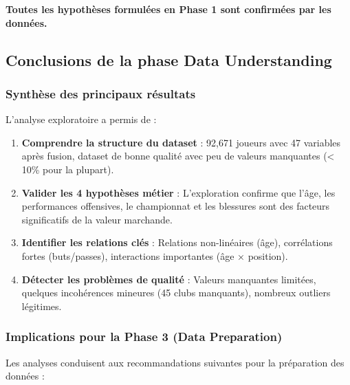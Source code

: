\documentclass[12pt,a4paper]{article}
\begin{document}
\textbf{Toutes les hypothèses formulées en Phase 1 sont confirmées par les données.}

\newpage

\subsection{Conclusions de la phase Data Understanding}

\subsubsection{Synthèse des principaux résultats}

L'analyse exploratoire a permis de :

\begin{enumerate}[leftmargin=*]
    \item \textbf{Comprendre la structure du dataset} : 92,671 joueurs avec 47 variables après fusion, dataset de bonne qualité avec peu de valeurs manquantes (< 10\% pour la plupart).
    
    \item \textbf{Valider les 4 hypothèses métier} : L'exploration confirme que l'âge, les performances offensives, le championnat et les blessures sont des facteurs significatifs de la valeur marchande.
    
    \item \textbf{Identifier les relations clés} : Relations non-linéaires (âge), corrélations fortes (buts/passes), interactions importantes (âge × position).
    
    \item \textbf{Détecter les problèmes de qualité} : Valeurs manquantes limitées, quelques incohérences mineures (45 clubs manquants), nombreux outliers légitimes.
\end{enumerate}

\subsubsection{Implications pour la Phase 3 (Data Preparation)}

Les analyses conduisent aux recommandations suivantes pour la préparation des données :
\end{document}
